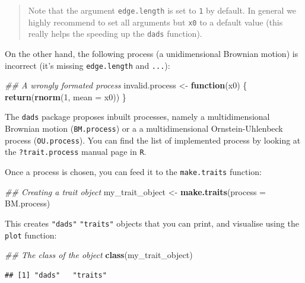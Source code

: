 \documentclass[]{book}
\newenvironment{Shaded}{\begin{snugshade}}{\end{snugshade}}
\newcommand{\CommentTok}[1]{\textcolor[rgb]{0.56,0.35,0.01}{\textit{#1}}}
\newcommand{\ControlFlowTok}[1]{\textcolor[rgb]{0.13,0.29,0.53}{\textbf{#1}}}
\newcommand{\DataTypeTok}[1]{\textcolor[rgb]{0.13,0.29,0.53}{#1}}
\newcommand{\DecValTok}[1]{\textcolor[rgb]{0.00,0.00,0.81}{#1}}
\newcommand{\KeywordTok}[1]{\textcolor[rgb]{0.13,0.29,0.53}{\textbf{#1}}}
\newcommand{\NormalTok}[1]{#1}
\newcommand{\StringTok}[1]{\textcolor[rgb]{0.31,0.60,0.02}{#1}}
\begin{document}
\begin{quote}
Note that the argument \texttt{edge.length} is set to \texttt{1} by default. In general we highly recommend to set all arguments but \texttt{x0} to a default value (this really helps the speeding up the \texttt{dads} function).
\end{quote}

On the other hand, the following process (a unidimensional Brownian motion) is incorrect (it's missing \texttt{edge.length} and \texttt{...}):

\begin{Shaded}
\begin{Highlighting}[]
\CommentTok{## A wrongly formated process}
\NormalTok{invalid.process <-}\StringTok{ }\ControlFlowTok{function}\NormalTok{(x0) \{}
    \KeywordTok{return}\NormalTok{(}\KeywordTok{rnorm}\NormalTok{(}\DecValTok{1}\NormalTok{, }\DataTypeTok{mean =}\NormalTok{ x0))}
\NormalTok{\}}
\end{Highlighting}
\end{Shaded}

The \texttt{dads} package proposes inbuilt processes, namely a multidimensional Brownian motion (\texttt{BM.process}) or a a multidimensional Ornstein-Uhlenbeck process (\texttt{OU.process}).
You can find the list of implemented process by looking at the \texttt{?trait.process} manual page in \texttt{R}.

Once a process is chosen, you can feed it to the \texttt{make.traits} function:

\begin{Shaded}
\begin{Highlighting}[]
\CommentTok{## Creating a trait object}
\NormalTok{my_trait_object <-}\StringTok{ }\KeywordTok{make.traits}\NormalTok{(}\DataTypeTok{process =}\NormalTok{ BM.process)}
\end{Highlighting}
\end{Shaded}

This creates \texttt{"dads"} \texttt{"traits"} objects that you can print, and visualise using the \texttt{plot} function:

\begin{Shaded}
\begin{Highlighting}[]
\CommentTok{## The class of the object}
\KeywordTok{class}\NormalTok{(my_trait_object)}
\end{Highlighting}
\end{Shaded}

\begin{verbatim}
## [1] "dads"   "traits"
\end{verbatim}
\end{document}
